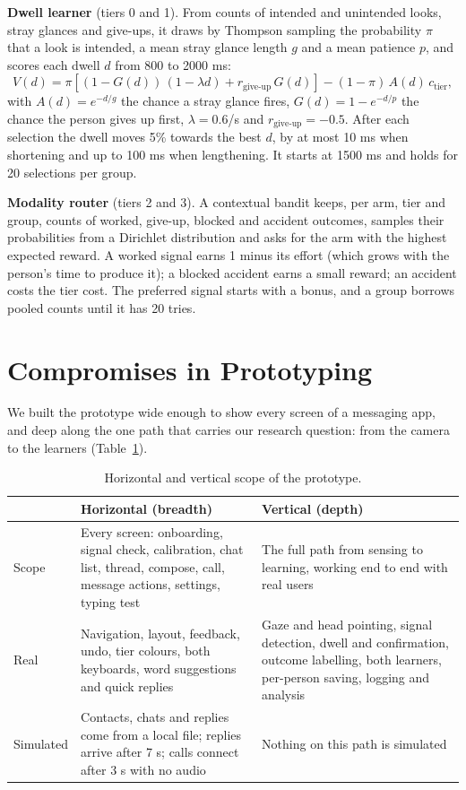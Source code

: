 \documentclass[manuscript,review]{acmart}
\begin{document}
\textbf{Dwell learner} (tiers 0 and 1). From counts of intended and unintended looks, stray
glances and give-ups, it draws by Thompson sampling \cite{thompson1933} the probability $\pi$ that
a look is intended, a mean stray glance length $g$ and a mean patience $p$, and scores each dwell
$d$ from 800 to 2000 ms:
\[
  V(d) = \pi\left[(1 - G(d))\,(1 - \lambda d) + r_{\text{give-up}}\,G(d)\right] - (1-\pi)\,A(d)\,c_{\text{tier}},
\]
with $A(d) = e^{-d/g}$ the chance a stray glance fires, $G(d) = 1 - e^{-d/p}$ the chance the person
gives up first, $\lambda = 0.6$/s and $r_{\text{give-up}} = -0.5$. After each selection the dwell
moves 5\% towards the best $d$, by at most 10 ms when shortening and up to 100 ms when lengthening.
It starts at 1500 ms and holds for 20 selections per group.

\textbf{Modality router} (tiers 2 and 3). A contextual bandit \cite{li2010} keeps, per arm, tier
and group, counts of worked, give-up, blocked and accident outcomes, samples their probabilities
from a Dirichlet distribution and asks for the arm with the highest expected reward. A worked
signal earns 1 minus its effort (which grows with the person's time to produce it); a blocked
accident earns a small reward; an accident costs the tier cost. The preferred signal starts with
a bonus, and a group borrows pooled counts until it has 20 tries.

\section{Compromises in Prototyping}

We built the prototype wide enough to show every screen of a messaging app, and deep along the
one path that carries our research question: from the camera to the learners
(Table~\ref{tab:compromise}).

\begin{table}[t]
  \caption{Horizontal and vertical scope of the prototype.}
  \label{tab:compromise}
  \small
  \begin{tabularx}{\linewidth}{lXX}
    \toprule
    & Horizontal (breadth) & Vertical (depth) \\
    \midrule
    Scope & Every screen: onboarding, signal check, calibration, chat list, thread, compose, call,
            message actions, settings, typing test & The full path from sensing to learning,
            working end to end with real users \\
    Real & Navigation, layout, feedback, undo, tier colours, both keyboards, word suggestions and
           quick replies & Gaze and head pointing, signal detection, dwell and confirmation,
           outcome labelling, both learners, per-person saving, logging and analysis \\
    Simulated & Contacts, chats and replies come from a local file; replies arrive after 7 s; calls
                connect after 3 s with no audio & Nothing on this path is simulated \\
    \bottomrule
  \end{tabularx}
\end{table}
\end{document}
